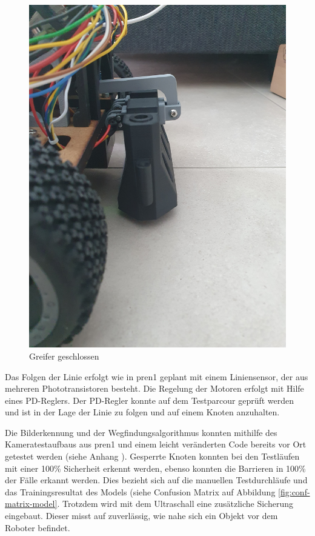 \begin{figure}[H]
\begin{minipage}[b]{0.49\textwidth}
  \includegraphics[width=\textwidth, angle=-90]{assets/MT/greifer-close.jpg}
  \caption{Greifer geschlossen}
  \label{fig:griefe-rclose}
\end{minipage}
\end{figure}

Das Folgen der Linie erfolgt wie in \acrshort{pren1} geplant mit einem Liniensensor, der aus mehreren Phototransistoren besteht. Die Regelung der Motoren erfolgt mit Hilfe eines PD-Reglers. Der PD-Regler konnte auf dem Testparcour geprüft werden und ist in der Lage der Linie zu folgen und auf einem Knoten anzuhalten.

Die Bilderkennung und der Wegfindungsalgorithmus konnten mithilfe des Kameratestaufbaus aus \acrshort{pren1} und einem leicht veränderten Code bereits vor Ort getestet werden (siehe Anhang \pageref{statische-traver}). Gesperrte Knoten konnten bei den Testläufen mit einer 100\% Sicherheit erkennt werden, ebenso konnten die Barrieren in 100\% der Fälle erkannt werden. Dies bezieht sich auf die manuellen Testdurchläufe und das Trainingsresultat des Models (siehe Confusion Matrix auf Abbildung \ref{fig:conf-matrix-model}. Trotzdem wird mit dem Ultraschall eine zusätzliche Sicherung eingebaut. Dieser misst auf \pm 1cm zuverlässig, wie nahe sich ein Objekt vor dem Roboter befindet.

